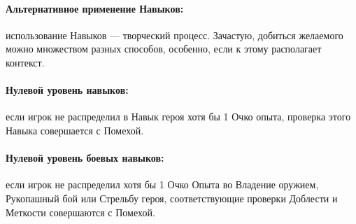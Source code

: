 \paragraph{Альтернативное применение Навыков:} использование Навыков — творческий процесс. Зачастую, добиться желаемого можно множеством разных способов, особенно, если к этому располагает контекст.
\paragraph{Нулевой уровень навыков:} если игрок не распределил в Навык героя хотя бы 1 Очко опыта, проверка этого Навыка совершается с Помехой.
\paragraph{Нулевой уровень боевых навыков:} если игрок не распределил хотя бы 1 Очко Опыта во Владение оружием, Рукопашный бой или Стрельбу героя, соответствующие проверки Доблести и Меткости совершаются с Помехой.

